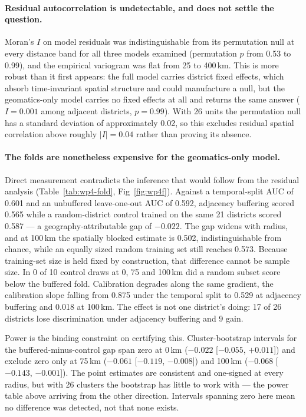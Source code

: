 \paragraph{Residual autocorrelation is undetectable, and does not settle the question.} Moran's $I$ on model residuals was indistinguishable from its permutation null at every distance band for all three models examined (permutation $p$ from 0.53 to 0.99), and the empirical variogram was flat from 25 to 400\,km. This is more robust than it first appears: the full model carries district fixed effects, which absorb time-invariant spatial structure and could manufacture a null, but the geomatics-only model carries no fixed effects at all and returns the same answer ($I=0.001$ among adjacent districts, $p=0.99$). With 26 units the permutation null has a standard deviation of approximately 0.02, so this excludes residual spatial correlation above roughly $|I|=0.04$ rather than proving its absence.

\paragraph{The folds are nonetheless expensive for the geomatics-only model.} Direct measurement contradicts the inference that would follow from the residual analysis (Table~\ref{tab:wp4-fold}, Fig~\ref{fig:wp4f}). Against a temporal-split AUC of 0.601 and an unbuffered leave-one-out AUC of 0.592, adjacency buffering scored 0.565 while a random-district control trained on the same 21 districts scored 0.587 --- a geography-attributable gap of $-0.022$. The gap widens with radius, and at 100\,km the spatially blocked estimate is 0.502, indistinguishable from chance, while an equally sized random training set still reaches 0.573. Because training-set size is held fixed by construction, that difference cannot be sample size. In 0 of 10 control draws at 0, 75 and 100\,km did a random subset score below the buffered fold. Calibration degrades along the same gradient, the calibration slope falling from 0.875 under the temporal split to 0.529 at adjacency buffering and 0.018 at 100\,km. The effect is not one district's doing: 17 of 26 districts lose discrimination under adjacency buffering and 9 gain.

Power is the binding constraint on certifying this. Cluster-bootstrap intervals for the buffered-minus-control gap span zero at 0\,km ($-0.022$ [$-0.055$, $+0.011$]) and exclude zero only at 75\,km ($-0.061$ [$-0.119$, $-0.008$]) and 100\,km ($-0.068$ [$-0.143$, $-0.001$]). The point estimates are consistent and one-signed at every radius, but with 26 clusters the bootstrap has little to work with --- the power table above arriving from the other direction. Intervals spanning zero here mean no difference was detected, not that none exists.

